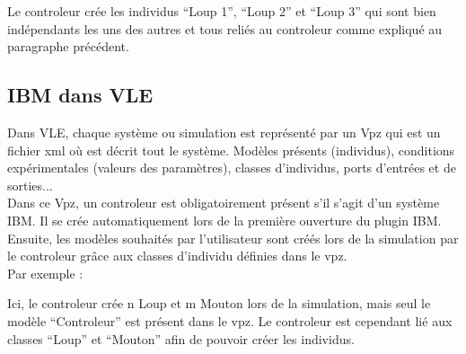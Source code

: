 Le controleur crée les individus ``Loup 1'', ``Loup 2'' et ``Loup 3'' qui sont bien indépendants les uns des autres et tous reliés au controleur comme expliqué au paragraphe précédent. \\

\subsection{IBM dans VLE}
Dans VLE, chaque système ou simulation est représenté par un Vpz qui est un fichier xml où est décrit tout le système. Modèles présents (individus), conditions expérimentales (valeurs des paramètres), classes d'individus, ports d'entrées et de sorties...\\
Dans ce Vpz, un controleur est obligatoirement présent s'il s'agit d'un système IBM. Il se crée automatiquement lors de la première ouverture du plugin IBM. \\Ensuite, les modèles souhaités par l'utilisateur sont créés lors de la simulation par le controleur grâce aux classes d'individu définies dans le vpz.\\
Par exemple : \\
\noindent\begin{minipage}{\linewidth}%
\end{minipage}

Ici, le controleur crée n Loup et m Mouton lors de la simulation, mais seul le modèle ``Controleur'' est présent dans le vpz. Le controleur est cependant lié aux classes ``Loup'' et ``Mouton'' afin de pouvoir créer les individus.

